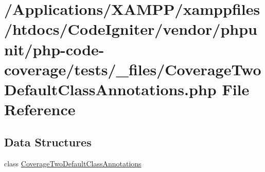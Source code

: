 \hypertarget{php-code-coverage_2tests_2__files_2_coverage_two_default_class_annotations_8php}{}\section{/\+Applications/\+X\+A\+M\+P\+P/xamppfiles/htdocs/\+Code\+Igniter/vendor/phpunit/php-\/code-\/coverage/tests/\+\_\+files/\+Coverage\+Two\+Default\+Class\+Annotations.php File Reference}
\label{php-code-coverage_2tests_2__files_2_coverage_two_default_class_annotations_8php}
\subsection*{Data Structures}
\begin{DoxyCompactItemize}
\item 
class \mbox{\hyperlink{class_coverage_two_default_class_annotations}{Coverage\+Two\+Default\+Class\+Annotations}}
\end{DoxyCompactItemize}
